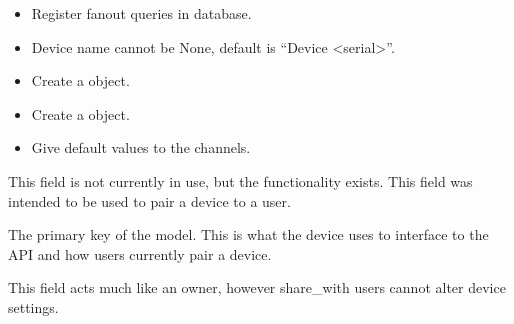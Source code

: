 \documentclass[letterpaper,10pt,english]{sphinxmanual}
\begin{document}
\begin{fulllineitems}
\begin{fulllineitems}
\begin{itemize}
\item {} 
Register fanout queries in database.

\item {} 
Device name cannot be None, default is ``Device \textless{}serial\textgreater{}''.

\item {} 
Create a {\hyperref[modules/farmer:farmer.models.DeviceSettings]{\emph{}}} object.

\item {} 
Create a {\hyperref[modules/webapp:webapp.models.DeviceWebSettings]{\emph{}}} object.

\item {} 
Give default values to the channels.

\end{itemize}

\end{fulllineitems}


\begin{fulllineitems}
\label{modules/microdata:microdata.models.Device.secret_key}
This field is not currently in use, but the functionality exists. This field was intended to be used to pair a device to a user.

\end{fulllineitems}


\begin{fulllineitems}
\label{modules/microdata:microdata.models.Device.serial}
The primary key of the model. This is what the device uses to interface to the API and how users currently pair a device.

\end{fulllineitems}


\begin{fulllineitems}
\label{modules/microdata:microdata.models.Device.share_with}
This field acts much like an owner, however share\_with users cannot alter device settings.

\end{fulllineitems}


\end{fulllineitems}
\end{document}
